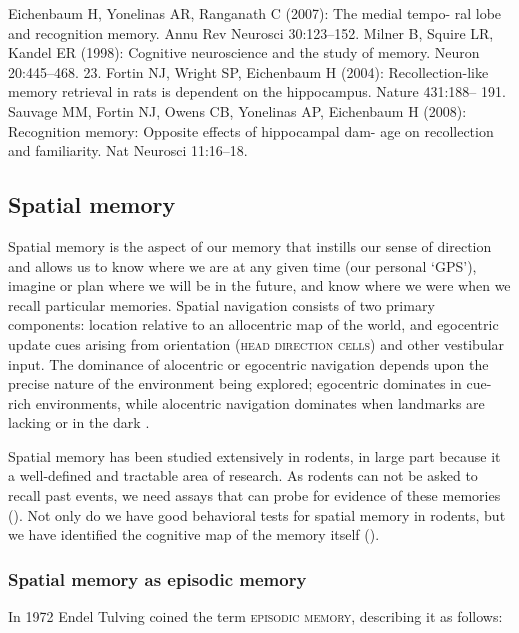 Eichenbaum H, Yonelinas AR, Ranganath C (2007): The medial tempo- ral lobe and recognition memory. Annu Rev Neurosci 30:123–152.
Milner B, Squire LR, Kandel ER (1998): Cognitive neuroscience and the study of memory. Neuron 20:445–468.
23.
Fortin NJ, Wright SP, Eichenbaum H (2004): Recollection-like memory retrieval in rats is dependent on the hippocampus. Nature 431:188– 191.
Sauvage MM, Fortin NJ, Owens CB, Yonelinas AP, Eichenbaum H (2008): Recognition memory: Opposite effects of hippocampal dam- age on recollection and familiarity. Nat Neurosci 11:16–18.

\subsection{Spatial memory}\label{sec:intro:memory:spatial}
Spatial memory is the aspect of our memory that instills our sense of direction and allows us to know where we are at any given time (our personal `GPS'), imagine or plan where we will be in the future, and know where we were when we recall particular memories.
Spatial navigation consists of two primary components: location relative to an allocentric map of the world, and egocentric update cues arising from orientation (\textsc{head direction cells}) and other vestibular input.
The dominance of alocentric or egocentric navigation depends upon the precise nature of the environment being explored; egocentric dominates in cue-rich environments, while alocentric navigation dominates when landmarks are lacking or in the dark \citep{Knierim1998}.

Spatial memory has been studied extensively in rodents, in large part because it a well-defined and tractable area of research.
As rodents can not be asked to recall past events, we need assays that can probe for evidence of these memories ().
Not only do we have good behavioral tests for spatial memory in rodents, but we have identified the cognitive map of the memory itself ().

\subsubsection{Spatial memory as episodic memory}\label{sec:intro:memory:spatial-episodic}
In 1972 Endel Tulving coined the term \textsc{episodic memory}, describing it as follows:


